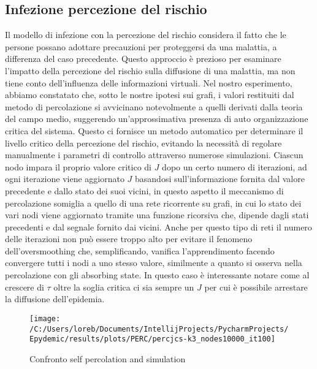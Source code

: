 \subsection{Infezione percezione del rischio}\label{subsec:res-infezione-con-la-percezione-del-rischio}
    Il modello di infezione con la percezione del rischio considera il fatto che le persone possano adottare precauzioni
    per proteggersi da una malattia, a differenza del caso precedente.
    Questo approccio è prezioso per esaminare l'impatto della percezione del rischio sulla diffusione di una malattia,
    ma non tiene conto dell'influenza delle informazioni virtuali.
    Nel nostro esperimento, abbiamo constatato che, sotto le nostre ipotesi sui grafi, i valori restituiti dal metodo di
    percolazione si avvicinano notevolmente a quelli derivati dalla teoria del campo medio, suggerendo un'approssimativa
    presenza di auto organizzazione critica del sistema.
    Questo ci fornisce un metodo automatico per determinare il livello critico della percezione del rischio, evitando la
    necessità di regolare manualmente i parametri di controllo attraverso numerose simulazioni.
    Ciascun nodo impara il proprio valore critico di $J$ dopo un certo numero di iterazioni, ad ogni iterazione
    viene aggiornato $J$ basandosi sull'informazione fornita dal valore precedente e dallo stato dei suoi vicini, in
    questo aspetto il meccanismo di percolazione somiglia a quello di una rete ricorrente su grafi, in cui lo stato dei
    vari nodi viene aggiornato tramite una funzione ricorsiva che, dipende dagli stati precedenti e dal segnale fornito dai
    vicini.
    Anche per questo tipo di reti il numero delle iterazioni non può essere troppo alto per evitare il fenomeno
    dell'oversmoothing che, semplificando, vanifica l'apprendimento facendo convergere tutti i nodi a uno stesso valore,
    similmente a quanto si osserva nella percolazione con gli absorbing state.
    In questo caso è interessante notare come al crescere di $\tau$ oltre la soglia critica ci sia sempre un $J$ per cui è
    possibile arrestare la diffusione dell'epidemia.

    \begin{figure}[H]
        \texttt{[image: /C:/Users/loreb/Documents/IntellijProjects/PycharmProjects/Epydemic/results/plots/PERC/percjcs-k3\_nodes10000\_it100]}\caption{Confronto self percolation and simulation}
        \label{fig:graficoJC}
    \end{figure}

